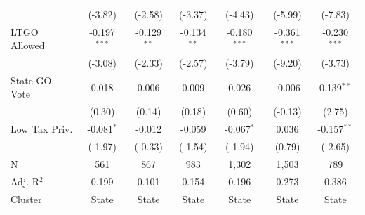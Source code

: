 \begin{tabular*}{\textwidth}{@{\extracolsep{\fill}}lcccccc}
                              & (-3.82)       & (-2.58)      & (-3.37)       & (-4.43)       & (-5.99)       & (-7.83)\\   
   LTGO Allowed               & -0.197$^{***}$ & -0.129$^{**}$ & -0.134$^{**}$  & -0.180$^{***}$ & -0.361$^{***}$ & -0.230$^{***}$\\   
                              & (-3.08)       & (-2.33)      & (-2.57)       & (-3.79)       & (-9.20)       & (-3.73)\\   
   State GO Vote              & 0.018          & 0.006         & 0.009          & 0.026          & -0.006         & 0.139$^{**}$\\   
                              & (0.30)        & (0.14)       & (0.18)        & (0.60)        & (-0.13)       & (2.75)\\   
   Low Tax Priv.              & -0.081$^{*}$   & -0.012        & -0.059         & -0.067$^{*}$   & 0.036          & -0.157$^{**}$\\   
                              & (-1.97)       & (-0.33)      & (-1.54)       & (-1.94)       & (0.79)        & (-2.65)\\   
   \hline
   N               & 561            & 867           & 983            & 1,302          & 1,503          & 789\\  
   Adj. R$^2$             & 0.199          & 0.101         & 0.154          & 0.196          & 0.273          & 0.386\\  
   Cluster              & State & State & State & State & State & State\\  
   \bottomrule
\end{tabular*}
\par\endgroup
